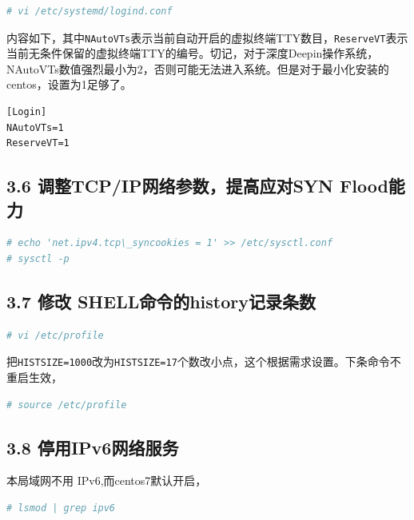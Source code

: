 \documentclass[doctor,openright,twoside]{sjtuthesis}
\newcommand{\passthrough}[1]{#1}
\theoremstyle{plain}
\theoremstyle{definition}
\theoremstyle{remark}
\theoremstyle{ocrenumbox}
\theoremstyle{plain}
\begin{document}
\begin{lstlisting}[language=bash]
# vi /etc/systemd/logind.conf
\end{lstlisting}

内容如下，其中\passthrough{\lstinline!NAutoVTs!}表示当前自动开启的虚拟终端TTY数目，\passthrough{\lstinline!ReserveVT!}表示当前无条件保留的虚拟终端TTY的编号。切记，对于深度Deepin操作系统，NAutoVTs数值强烈最小为2，否则可能无法进入系统。但是对于最小化安装的centos，设置为1足够了。

\begin{lstlisting}
[Login]
NAutoVTs=1
ReserveVT=1
\end{lstlisting}

\hypertarget{tcpipsyn-flood}{%
\subsection{3.6 调整TCP/IP网络参数，提高应对SYN Flood能力}\label{tcpipsyn-flood}}

\begin{lstlisting}[language=bash]
# echo 'net.ipv4.tcp\_syncookies = 1' >> /etc/sysctl.conf
# sysctl -p
\end{lstlisting}

\hypertarget{shellhistory}{%
\subsection{3.7 修改 SHELL命令的history记录条数}\label{shellhistory}}

\begin{lstlisting}[language=bash]
# vi /etc/profile
\end{lstlisting}

把\passthrough{\lstinline!HISTSIZE=1000!}改为\passthrough{\lstinline!HISTSIZE=17!}个数改小点，这个根据需求设置。下条命令不重启生效，

\begin{lstlisting}[language=bash]
# source /etc/profile
\end{lstlisting}

\hypertarget{ipv6}{%
\subsection{3.8 停用IPv6网络服务}\label{ipv6}}

本局域网不用 IPv6,而centos7默认开启，

\begin{lstlisting}[language=bash]
# lsmod | grep ipv6
\end{lstlisting}
\end{document}
